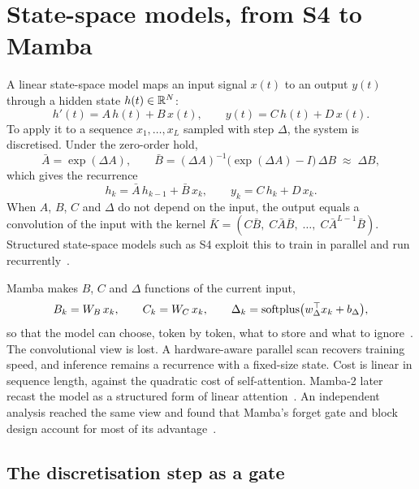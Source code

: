 \section{State-space models, from S4 to Mamba}
\label{sec:ssm}

A linear state-space model maps an input signal $x(t)$ to an output $y(t)$
through a hidden state $h(t)\in\mathbb{R}^{N}$:
\begin{equation}
  h'(t) = A\,h(t) + B\,x(t), \qquad y(t) = C\,h(t) + D\,x(t).
  \label{eq:ssm-cont}
\end{equation}
To apply it to a sequence $x_1,\dots,x_L$ sampled with step $\Delta$, the
system is discretised. Under the zero-order hold,
\begin{equation}
  \bar A = \exp(\Delta A), \qquad
  \bar B = (\Delta A)^{-1}\bigl(\exp(\Delta A) - I\bigr)\,\Delta B \;\approx\; \Delta B,
  \label{eq:zoh}
\end{equation}
which gives the recurrence
\begin{equation}
  h_k = \bar A\, h_{k-1} + \bar B\, x_k, \qquad y_k = C\, h_k + D\, x_k .
  \label{eq:ssm-rec}
\end{equation}
When $A$, $B$, $C$ and $\Delta$ do not depend on the input, the output equals
a convolution of the input with the kernel
$\bar K = (C\bar B,\; C\bar A\bar B,\; \dots,\; C\bar A^{L-1}\bar B)$. Structured
state-space models such as S4 exploit this to train in parallel and run
recurrently~\citep{gu2022s4,smith2023s5}.

Mamba makes $B$, $C$ and $\Delta$ functions of the current input,
\begin{equation}
  B_k = W_B\,x_k, \qquad C_k = W_C\,x_k, \qquad
  \Delta_k = \operatorname{softplus}\bigl(w_\Delta^{\top} x_k + b_\Delta\bigr),
  \label{eq:selective}
\end{equation}
so that the model can choose, token by token, what to store and what to
ignore~\citep{gu2023mamba}. The convolutional view is lost. A
hardware-aware parallel scan recovers training speed, and inference
remains a recurrence with a fixed-size state. Cost is linear in sequence
length, against the quadratic cost of self-attention. Mamba-2 later recast
the model as a structured form of linear attention~\citep{dao2024mamba2}. An
independent analysis reached the same view and found that Mamba's forget
gate and block design account for most of its advantage~\citep{han2024mlla}.

\subsection{The discretisation step as a gate}
\label{sec:delta}

